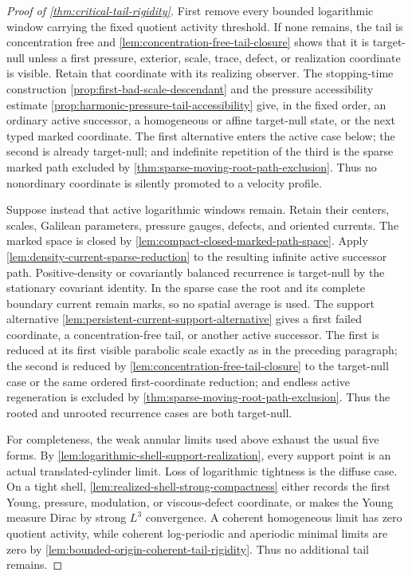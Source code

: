 \documentclass[11pt]{amsart}
\numberwithin{equation}{section}
\theoremstyle{plain}
\theoremstyle{definition}
\theoremstyle{remark}
\begin{document}
\begin{proof}[Proof of \cref{thm:critical-tail-rigidity}]
First remove every bounded logarithmic window carrying the fixed quotient
activity threshold.  If none remains, the tail is concentration free and
\cref{lem:concentration-free-tail-closure} shows that it is target-null unless
a first pressure, exterior, scale, trace, defect, or realization coordinate
is visible.  Retain that coordinate with its realizing observer.  The
stopping-time construction \cref{prop:first-bad-scale-descendant} and the
pressure accessibility estimate
\cref{prop:harmonic-pressure-tail-accessibility} give, in the fixed order, an
ordinary active successor, a homogeneous or affine target-null state, or the
next typed marked coordinate.  The first alternative enters the active case
below; the second is already target-null; and indefinite repetition of the
third is the sparse marked path excluded by
\cref{thm:sparse-moving-root-path-exclusion}.  Thus no nonordinary coordinate
is silently promoted to a velocity profile.

Suppose instead that active logarithmic windows remain.  Retain their centers,
scales, Galilean parameters, pressure gauges, defects, and oriented currents.
The marked space is closed by
\cref{lem:compact-closed-marked-path-space}.  Apply
\cref{lem:density-current-sparse-reduction} to the resulting infinite active
successor path.  Positive-density or covariantly balanced recurrence is
target-null by the stationary covariant identity.  In the sparse case the
root and its complete boundary current remain marks, so no spatial average is
used.  The support alternative
\cref{lem:persistent-current-support-alternative} gives a first failed
coordinate, a concentration-free tail, or another active successor.  The
first is reduced at its first visible parabolic scale exactly as in the
preceding paragraph; the second is reduced by
\cref{lem:concentration-free-tail-closure} to the target-null case or the same
ordered first-coordinate reduction; and endless active regeneration is
excluded by
\cref{thm:sparse-moving-root-path-exclusion}.  Thus the rooted and unrooted
recurrence cases are both target-null.

For completeness, the weak annular limits used above exhaust the usual five
forms.  By \cref{lem:logarithmic-shell-support-realization}, every support
point is an actual translated-cylinder limit.  Loss of logarithmic tightness
is the diffuse case.  On a tight shell,
\cref{lem:realized-shell-strong-compactness} either records the first Young,
pressure, modulation, or viscous-defect coordinate, or makes the Young measure
Dirac by strong \(L^3\) convergence.  A coherent homogeneous limit has zero
quotient activity, while coherent log-periodic and aperiodic minimal limits
are zero by \cref{lem:bounded-origin-coherent-tail-rigidity}.  Thus no
additional tail remains.
\end{proof}
\end{document}
